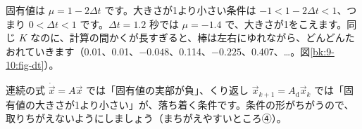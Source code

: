 固有値は $\mu=1-2\Delta t$ です。大きさが1より小さい条件は $-1<1-2\Delta t<1$、つまり $0<\Delta t<1$ です。$\Delta t=1.2$ 秒では $\mu=-1.4$ で、大きさが1をこえます。同じ $K$ なのに、計算の間かくが長すぎると、棒は左右にゆれながら、どんどんたおれていきます（0.01、0.01、$-0.048$、0.114、$-0.225$、0.407、…。図\ref{bk:9-10:fig-dt}）。

\begin{bkcenter}
\label{bk:9-10:tab-sheet}
\end{bkcenter}

連続の式 $\dot{\vec x}=A\vec x$ では「固有値の実部が負」、くり返し $\vec x_{k+1}=A_{\mathrm d}\vec x_k$ では「固有値の大きさが1より小さい」が、落ち着く条件です。条件の形がちがうので、取りちがえないようにしましょう（まちがえやすいところ④）。

